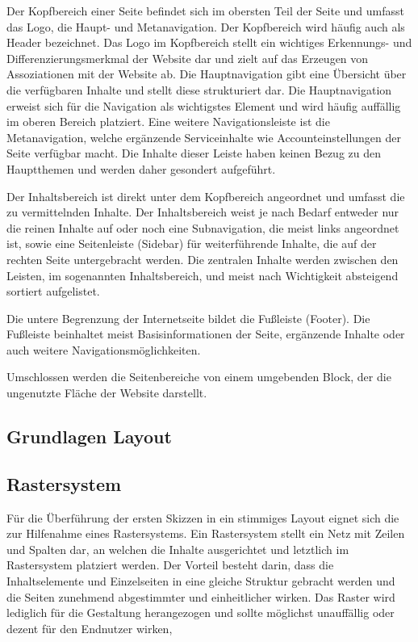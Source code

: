 Der Kopfbereich einer Seite befindet sich im obersten Teil der Seite und umfasst das Logo, die Haupt- und Metanavigation. Der Kopfbereich wird häufig auch als Header bezeichnet.
Das Logo im Kopfbereich stellt ein wichtiges Erkennungs- und Differenzierungsmerkmal der Website dar und zielt auf das Erzeugen von Assoziationen mit der Website ab. Die Hauptnavigation gibt eine Übersicht über die verfügbaren Inhalte und stellt diese strukturiert dar. Die Hauptnavigation erweist sich für die Navigation als wichtigstes Element und wird häufig auffällig im oberen Bereich platziert. Eine weitere Navigationsleiste ist die Metanavigation, welche ergänzende Serviceinhalte wie \zB Accounteinstellungen der Seite verfügbar macht. Die Inhalte dieser Leiste haben keinen Bezug zu den Hauptthemen und werden daher gesondert aufgeführt.

Der Inhaltsbereich ist direkt unter dem Kopfbereich angeordnet und umfasst die zu vermittelnden Inhalte. Der Inhaltsbereich weist je nach Bedarf entweder nur die reinen Inhalte auf oder \ggf noch eine Subnavigation, die meist links angeordnet ist, sowie eine Seitenleiste (\engl Sidebar) für weiterführende Inhalte, die auf der rechten Seite untergebracht werden. Die zentralen Inhalte werden zwischen den Leisten, im sogenannten Inhaltsbereich, und meist nach Wichtigkeit absteigend sortiert aufgelistet.

Die untere Begrenzung der Internetseite bildet die Fußleiste (\engl Footer). Die Fußleiste beinhaltet meist Basisinformationen der Seite, ergänzende Inhalte oder auch \ggf weitere Navigationsmöglichkeiten.

Umschlossen werden die Seitenbereiche von einem umgebenden Block, der die ungenutzte Fläche der Website darstellt.

\subsection{Grundlagen Layout}
\subsection{Rastersystem}

Für die Überführung der ersten Skizzen in ein stimmiges Layout eignet sich die zur Hilfenahme eines Rastersystems. Ein Rastersystem stellt ein Netz mit Zeilen und Spalten dar, an welchen die Inhalte ausgerichtet und letztlich im Rastersystem platziert werden. Der Vorteil besteht darin, dass die Inhaltselemente und Einzelseiten in eine gleiche Struktur gebracht werden und die Seiten zunehmend abgestimmter und einheitlicher wirken. Das Raster wird lediglich für die Gestaltung herangezogen und sollte möglichst unauffällig oder dezent für den Endnutzer wirken,


